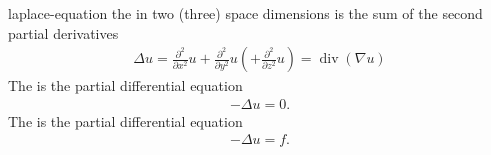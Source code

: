 \begin{Definition}{laplace-equation}
  the  in two (three) space dimensions is the sum of
  the second partial derivatives
  \begin{gather}
    \label{eq:fd:10}
    \Delta u = \frac{\partial^2}{\partial x^2}u
    + \frac{\partial^2}{\partial y^2}u
    \left(+ \frac{\partial^2}{\partial z^2}u\right)
    = \operatorname{div}(\nabla u)
  \end{gather}
  The  is the partial differential equation
  \begin{gather}
    \label{eq:fd:11}
    -\Delta u = 0.
  \end{gather}
  The  is the partial differential equation
  \begin{gather}
    \label{eq:fd:9}
    -\Delta u = f.
  \end{gather}
\end{Definition}

